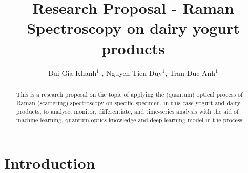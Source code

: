 \documentclass{iopjournal}
\begin{document}

\title{Research Proposal - Raman Spectroscopy on dairy yogurt products}

\author{Bui Gia Khanh$^1$ , Nguyen Tien Duy$^1$, Tran Duc Anh$^1$}








\begin{abstract}
       This is a research proposal on the topic of applying the (quantum) optical process of Raman (scattering) spectroscopy on specific specimen, in this case yogurt and dairy products, to analyse, monitor, differentiate, and time-series analysis with the aid of machine learning, quantum optics knowledge and deep learning model in the process. 
\end{abstract}

\section{Introduction}
\end{document}
